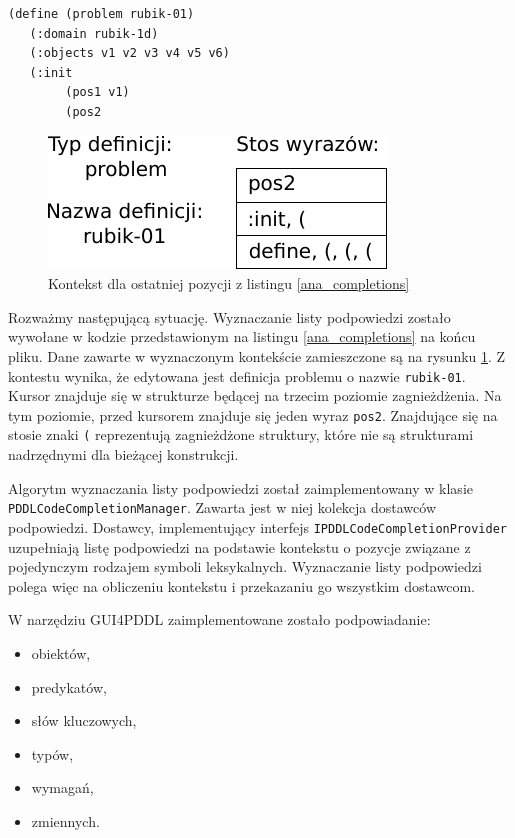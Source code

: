 \begin{Code}
\begin{lstlisting}[language=LISP,frame=single,label=ana_completions, caption=Edytowany kod PDDL]
(define (problem rubik-01)
   (:domain rubik-1d)
   (:objects v1 v2 v3 v4 v5 v6)
   (:init
        (pos1 v1)
        (pos2 
\end{lstlisting}
\end{Code}

\begin{figure}[h]
  \centering
    \includegraphics{img/ana_completion.pdf}
    \caption{Kontekst dla ostatniej pozycji z listingu \ref{ana_completions}}
    \label{ana_context}
\end{figure}


Rozważmy następującą sytuację. Wyznaczanie listy podpowiedzi zostało wywołane w kodzie przedstawionym
na listingu \ref{ana_completions} na końcu pliku. Dane zawarte w wyznaczonym kontekście zamieszczone
są na rysunku \ref{ana_context}. Z kontestu wynika, że edytowana jest definicja problemu o nazwie
\texttt{rubik-01}. Kursor znajduje się w strukturze będącej na trzecim poziomie zagnieżdżenia.
 Na tym poziomie,
przed kursorem znajduje się jeden wyraz \texttt{pos2}. Znajdujące się na stosie znaki \texttt{(} 
reprezentują zagnieżdżone struktury, które nie są strukturami nadrzędnymi dla bieżącej konstrukcji.

Algorytm wyznaczania listy podpowiedzi został zaimplementowany w klasie \texttt{PDDLCodeCompletionManager}.
Zawarta jest w niej kolekcja dostawców podpowiedzi. Dostawcy, implementujący interfejs
\texttt{IPDDLCodeCompletionProvider} uzupełniają listę podpowiedzi na podstawie kontekstu 
o pozycje związane z pojedynczym rodzajem symboli leksykalnych. Wyznaczanie listy podpowiedzi polega 
więc na obliczeniu kontekstu i przekazaniu go wszystkim dostawcom.

W narzędziu GUI4PDDL zaimplementowane zostało podpowiadanie:
\begin{itemize}
\item obiektów,
\item predykatów,
\item słów kluczowych,
\item typów,
\item wymagań,
\item zmiennych.
\end{itemize}

